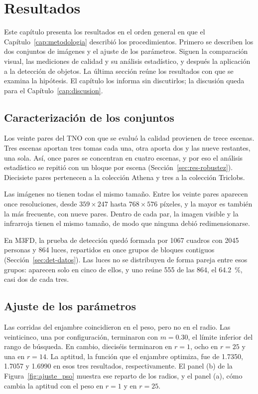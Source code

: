 \chapter{Resultados}
\label{cap:resultados}

Este capítulo presenta los resultados en el orden general en que el Capítulo~\ref{cap:metodologia}
describió los procedimientos. Primero se describen los dos conjuntos de imágenes y el ajuste de los
parámetros. Siguen la comparación visual, las mediciones de calidad y su análisis estadístico, y después
la aplicación a la detección de objetos. La última sección reúne los resultados con que se examina la
hipótesis. El capítulo los informa sin discutirlos; la discusión queda para el
Capítulo~\ref{cap:discusion}.

\section{Caracterización de los conjuntos}
\label{sec:caracterizacion}

Los veinte pares del TNO con que se evaluó la calidad provienen de trece escenas. Tres escenas aportan
tres tomas cada una, otra aporta dos y las nueve restantes, una sola. Así, once pares se concentran en
cuatro escenas, y por eso el análisis estadístico se repitió con un bloque por escena
(Sección~\ref{sec:res-robustez}). Diecisiete pares pertenecen a la colección Athena y tres a la
colección Triclobs.

Las imágenes no tienen todas el mismo tamaño. Entre los veinte pares aparecen once resoluciones, desde
$359 \times 247$ hasta $768 \times 576$ píxeles, y la mayor es también la más frecuente, con nueve
pares. Dentro de cada par, la imagen visible y la infrarroja tienen el mismo tamaño, de modo que ninguna
debió redimensionarse.

En M3FD, la prueba de detección quedó formada por 1067 cuadros con 2045 personas y 864 luces, repartidos
en once grupos de bloques contiguos (Sección~\ref{sec:det-datos}). Las luces no se distribuyen de forma
pareja entre esos grupos: aparecen solo en cinco de ellos, y uno reúne 555 de las 864, el 64.2~\%, casi
dos de cada tres.

\section{Ajuste de los parámetros}
\label{sec:res-ajuste}

Las corridas del enjambre coincidieron en el peso, pero no en el radio. Las veinticinco, una por
configuración, terminaron con $m = 0.30$, el límite inferior del rango de búsqueda. En cambio, dieciséis
terminaron en $r = 1$, ocho en $r = 25$ y una en $r = 14$. La aptitud, la función que el enjambre
optimiza, fue de 1.7350, 1.7057 y 1.6990 en esos tres resultados, respectivamente. El panel (b) de la
Figura~\ref{fig:ajuste_pso} muestra ese reparto de los radios, y el panel (a), cómo cambia la aptitud
con el peso en $r = 1$ y en $r = 25$.

